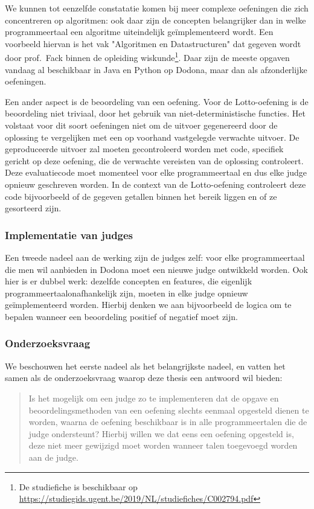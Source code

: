 We kunnen tot eenzelfde constatatie komen bij meer complexe oefeningen die zich concentreren op algoritmen: ook daar zijn de concepten belangrijker dan in welke programmeertaal een algoritme uiteindelijk geïmplementeerd wordt.
Een voorbeeld hiervan is het vak "Algoritmen en Datastructuren" dat gegeven wordt door prof.\ Fack binnen de opleiding wiskunde\footnote{De studiefiche is beschikbaar op \url{https://studiegids.ugent.be/2019/NL/studiefiches/C002794.pdf}}.
Daar zijn de meeste opgaven vandaag al beschikbaar in Java en Python op Dodona, maar dan als afzonderlijke oefeningen.

Een ander aspect is de beoordeling van een oefening.
Voor de Lotto-oefening is de beoordeling niet triviaal, door het gebruik van niet-deterministische functies.
Het volstaat voor dit soort oefeningen niet om de uitvoer gegenereerd door de oplossing te vergelijken met een op voorhand vastgelegde verwachte uitvoer.
De geproduceerde uitvoer zal moeten gecontroleerd worden met code, specifiek gericht op deze oefening, die de verwachte vereisten van de oplossing controleert.
Deze evaluatiecode moet momenteel voor elke programmeertaal en dus elke judge opnieuw geschreven worden.
In de context van de Lotto-oefening controleert deze code bijvoorbeeld of de gegeven getallen binnen het bereik liggen en of ze gesorteerd zijn.

\subsubsection{Implementatie van judges}

Een tweede nadeel aan de werking zijn de judges zelf: voor elke programmeertaal die men wil aanbieden in Dodona moet een nieuwe judge ontwikkeld worden.
Ook hier is er dubbel werk: dezelfde concepten en features, die eigenlijk programmeertaalonafhankelijk zijn, moeten in elke judge opnieuw geïmplementeerd worden.
Hierbij denken we aan bijvoorbeeld de logica om te bepalen wanneer een beoordeling positief of negatief moet zijn.

\subsubsection{Onderzoeksvraag}

We beschouwen het eerste nadeel als het belangrijkste nadeel, en vatten het samen als de onderzoeksvraag waarop deze thesis een antwoord wil bieden:

\begin{quote}
    Is het mogelijk om een judge zo te implementeren dat de opgave en beoordelingsmethoden van een oefening slechts eenmaal opgesteld dienen te worden, waarna de oefening beschikbaar is in alle programmeertalen die de judge ondersteunt?
    Hierbij willen we dat eens een oefening opgesteld is, deze niet meer gewijzigd moet worden wanneer talen toegevoegd worden aan de judge.
\end{quote}

